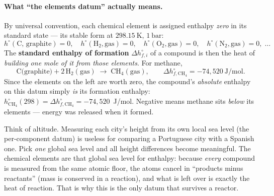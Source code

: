 \documentclass[11pt,a4paper]{article}
\begin{document}
\paragraph{What ``the elements datum'' actually means.}
By universal convention, each chemical element is assigned enthalpy
\emph{zero} in its standard state --- its stable form at
$298.15~\mathrm{K}$, $1~\mathrm{bar}$:
\begin{equation*}
   h^{\circ}(\text{C, graphite}) = 0, \quad
   h^{\circ}(\mathrm{H_2}, \text{gas}) = 0, \quad
   h^{\circ}(\mathrm{O_2}, \text{gas}) = 0, \quad
   h^{\circ}(\mathrm{N_2}, \text{gas}) = 0, \;\dots
\end{equation*}
The \textbf{standard enthalpy of formation} $\Delta h^{\circ}_{f,i}$ of
a compound is then the heat of \emph{building one mole of it from those
elements}.  For methane,
\begin{equation*}
   \text{C(graphite)} + 2\,\mathrm{H_2}(\text{gas})
   \;\longrightarrow\; \mathrm{CH_4}(\text{gas}),
   \qquad \Delta h^{\circ}_{f,\mathrm{CH_4}} = -74{,}520~\mathrm{J/mol}.
\end{equation*}
Since the elements on the left are worth zero, the compound's
\emph{absolute} enthalpy on this datum simply \emph{is} its formation
enthalpy: $h^{\circ}_{\mathrm{CH_4}}(298) = \Delta h^{\circ}_{f,\mathrm{CH_4}}
= -74{,}520$~J/mol.  Negative means methane sits \emph{below} its
elements --- energy was released when it formed.

\begin{intuition}
Think of altitude.  Measuring each city's height from its own local
sea level (the per-component datum) is useless for comparing a
Portuguese city with a Spanish one.  Pick \emph{one} global sea level
and all height differences become meaningful.  The chemical elements
are that global sea level for enthalpy: because \emph{every} compound
is measured from the same atomic floor, the atoms cancel in
``products minus reactants'' (mass is conserved in a reaction), and
what is left over is exactly the heat of reaction.  That is why this is
the only datum that survives a reactor.
\end{intuition}
\end{document}

